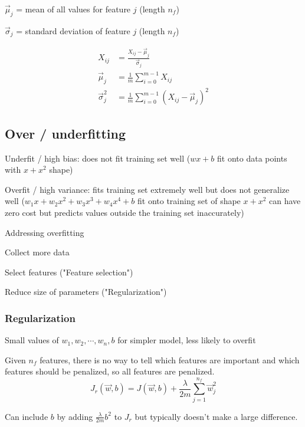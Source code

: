 \documentclass[12pt]{article}
\begin{document}
$\vec{\mu}_j$ = mean of all values for feature $j$ (length $n_f$)

$\vec{\sigma}_j$ = standard deviation of feature $j$ (length $n_f$)

\begin{align*}
    X_{ij} &= \frac{X_{ij} - \vec{\mu}_j}{\vec{\sigma}_j}\\
    \vec{\mu}_j &= \frac{1}{m} \sum_{i=0}^{m-1} X_{ij}\\
    \vec{\sigma}_j^2 &= \frac{1}{m} \sum_{i=0}^{m-1} (X_{ij} - \vec{\mu}_j)^2
\end{align*}

\subsection{Over / underfitting}

Underfit / high bias: does not fit training set well ($wx + b$ fit onto data points with $x + x^2$ shape)

Overfit / high variance: fits training set extremely well but does not generalize well ($w_1 x + w_2 x^2 + w_3 x^3 + w_4 x^4 + b$ fit onto training set of shape $x + x^2$ can have zero cost but predicts values outside the training set inaccurately)

\vspace{5px}

Addressing overfitting
\begin{myitemize}
	\item Collect more data
	\item Select features ("Feature selection")
	\item Reduce size of parameters ("Regularization")
\end{myitemize}

\subsubsection{Regularization}

Small values of $w_1,w_2,\cdots,w_n,b$ for simpler model, less likely to overfit

Given $n_f$ features, there is no way to tell which features are important and which features should be penalized, so all features are penalized.
\[ J_r(\vec{w},b) = J(\vec{w},b) + \frac{\lambda}{2m} \sum_{j=1}^{n_f} \vec{w}_j^2 \]

Can include $b$ by adding $\frac{\lambda}{2m} b^2$ to $J_r$ but typically doesn't make a large difference.
\end{document}
